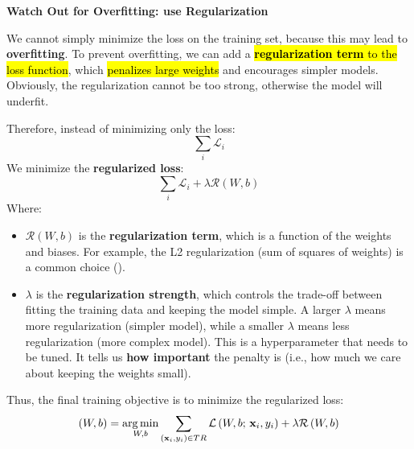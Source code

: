 \highspace
\begin{flushleft}
    \textcolor{Green3}{ \textbf{Watch Out for Overfitting: use Regularization}}
\end{flushleft}
We cannot simply minimize the loss on the training set, because this may lead to \textbf{overfitting}. To prevent overfitting, we can add a \hl{\textbf{regularization term} to the loss function}, which \hl{penalizes large weights} and encourages simpler models. Obviously, the regularization cannot be too strong, otherwise the model will underfit.

\highspace
Therefore, instead of minimizing only the loss:
\begin{equation*}
    \sum_{i} \mathcal{L}_{i}
\end{equation*}
We minimize the \textbf{regularized loss}:
\begin{equation*}
    \sum_{i} \mathcal{L}_{i} + \lambda \mathcal{R}\left(W, b\right)
\end{equation*}
Where:
\begin{itemize}
    \item $\mathcal{R}\left(W, b\right)$ is the \textbf{regularization term}, which is a function of the weights and biases. For example, the L2 regularization (sum of squares of weights) is a common choice ().
    \item $\lambda$ is the \textbf{regularization strength}, which controls the trade-off between fitting the training data and keeping the model simple. A larger $\lambda$ means more regularization (simpler model), while a smaller $\lambda$ means less regularization (more complex model). This is a hyperparameter that needs to be tuned. It tells us \textbf{how important} the penalty is (i.e., how much we care about keeping the weights small).
\end{itemize}
Thus, the final training objective is to minimize the regularized loss:
\begin{equation}
    \left(W,b\right) = \operatorname*{arg\,min}_{W,b} \sum_{\left(\mathbf{x}_{i}, y_{i}\right) \in TR} \mathcal{L}\left( W, b; \, \mathbf{x}_{i}, y_{i} \right) + \lambda \mathcal{R}\left(W, b\right)
\end{equation}